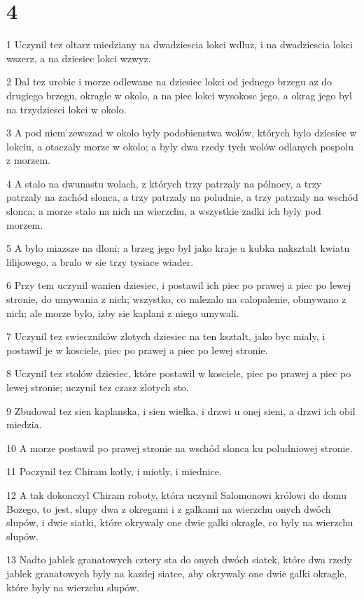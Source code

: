 \chapter{4}

\par 1 Uczynil tez oltarz miedziany na dwadziescia lokci wdluz, i na dwadziescia lokci wszerz, a na dziesiec lokci wzwyz.
\par 2 Dal tez urobic i morze odlewane na dziesiec lokci od jednego brzegu az do drugiego brzegu, okragle w okolo, a na piec lokci wysokosc jego, a okrag jego byl na trzydziesci lokci w okolo.
\par 3 A pod niem zewszad w okolo byly podobienstwa wolów, których bylo dziesiec w lokciu, a otaczaly morze w okolo; a byly dwa rzedy tych wolów odlanych pospolu z morzem.
\par 4 A stalo na dwunastu wolach, z których trzy patrzaly na pólnocy, a trzy patrzaly na zachód slonca, a trzy patrzaly na poludnie, a trzy patrzaly na wschód slonca; a morze stalo na nich na wierzchu, a wszystkie zadki ich byly pod morzem.
\par 5 A bylo miazsze na dloni; a brzeg jego byl jako kraje u kubka naksztalt kwiatu lilijowego, a bralo w sie trzy tysiace wiader.
\par 6 Przy tem uczynil wanien dziesiec, i postawil ich piec po prawej a piec po lewej stronie, do umywania z nich; wszystko, co nalezalo na calopalenie, obmywano z nich; ale morze bylo, izby sie kaplani z niego umywali.
\par 7 Uczynil tez swieczników zlotych dziesiec na ten ksztalt, jako byc mialy, i postawil je w kosciele, piec po prawej a piec po lewej stronie.
\par 8 Uczynil tez stolów dziesiec, które postawil w kosciele, piec po prawej a piec po lewej stronie; uczynil tez czasz zlotych sto.
\par 9 Zbudowal tez sien kaplanska, i sien wielka, i drzwi u onej sieni, a drzwi ich obil miedzia.
\par 10 A morze postawil po prawej stronie na wschód slonca ku poludniowej stronie.
\par 11 Poczynil tez Chiram kotly, i miotly, i miednice.
\par 12 A tak dokonczyl Chiram roboty, która uczynil Salomonowi królowi do domu Bozego, to jest, slupy dwa z okregami i z galkami na wierzchu onych dwóch slupów, i dwie siatki, które okrywaly one dwie galki okragle, co byly na wierzchu slupów.
\par 13 Nadto jablek granatowych cztery sta do onych dwóch siatek, które dwa rzedy jablek granatowych byly na kazdej siatce, aby okrywaly one dwie galki okragle, które byly na wierzchu slupów.
